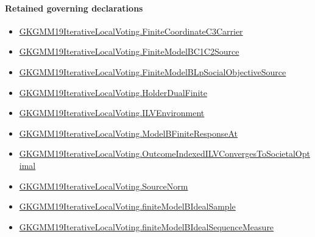 \documentclass[10pt]{article}
\begin{document}
\paragraph{Retained governing declarations}
\begin{itemize}\raggedright
\item \hyperlink{governing-declaration-56987670c9ba555c}{GKGMM19\allowbreak{}Iterative\allowbreak{}Local\allowbreak{}Voting.\allowbreak{}Finite\allowbreak{}Coordinate\allowbreak{}C3\allowbreak{}Carrier}
\item \hyperlink{governing-declaration-b2172f203bb89b25}{GKGMM19\allowbreak{}Iterative\allowbreak{}Local\allowbreak{}Voting.\allowbreak{}Finite\allowbreak{}Model\allowbreak{}BC1\allowbreak{}C2\allowbreak{}Source}
\item \hyperlink{governing-declaration-05cf1c1dee9d2a86}{GKGMM19\allowbreak{}Iterative\allowbreak{}Local\allowbreak{}Voting.\allowbreak{}Finite\allowbreak{}Model\allowbreak{}B\allowbreak{}Lp\allowbreak{}Social\allowbreak{}Objective\allowbreak{}Source}
\item \hyperlink{governing-declaration-e4a57c47bb5fbb49}{GKGMM19\allowbreak{}Iterative\allowbreak{}Local\allowbreak{}Voting.\allowbreak{}Holder\allowbreak{}Dual\allowbreak{}Finite}
\item \hyperlink{governing-declaration-df2ca62df1846667}{GKGMM19\allowbreak{}Iterative\allowbreak{}Local\allowbreak{}Voting.\allowbreak{}ILV\allowbreak{}Environment}
\item \hyperlink{governing-declaration-35a8e743fa21d9be}{GKGMM19\allowbreak{}Iterative\allowbreak{}Local\allowbreak{}Voting.\allowbreak{}Model\allowbreak{}B\allowbreak{}Finite\allowbreak{}Response\allowbreak{}At}
\item \hyperlink{governing-declaration-3e297ee911a81a7e}{GKGMM19\allowbreak{}Iterative\allowbreak{}Local\allowbreak{}Voting.\allowbreak{}Outcome\allowbreak{}Indexed\allowbreak{}ILV\allowbreak{}Converges\allowbreak{}To\allowbreak{}Societal\allowbreak{}Optimal}
\item \hyperlink{governing-declaration-6fa4ab9852321b03}{GKGMM19\allowbreak{}Iterative\allowbreak{}Local\allowbreak{}Voting.\allowbreak{}Source\allowbreak{}Norm}
\item \hyperlink{governing-declaration-41e1ceb0696b5f21}{GKGMM19\allowbreak{}Iterative\allowbreak{}Local\allowbreak{}Voting.\allowbreak{}finite\allowbreak{}Model\allowbreak{}B\allowbreak{}Ideal\allowbreak{}Sample}
\item \hyperlink{governing-declaration-4a521de5e9fb0dd0}{GKGMM19\allowbreak{}Iterative\allowbreak{}Local\allowbreak{}Voting.\allowbreak{}finite\allowbreak{}Model\allowbreak{}B\allowbreak{}Ideal\allowbreak{}Sequence\allowbreak{}Measure}

\end{itemize}
\end{document}
